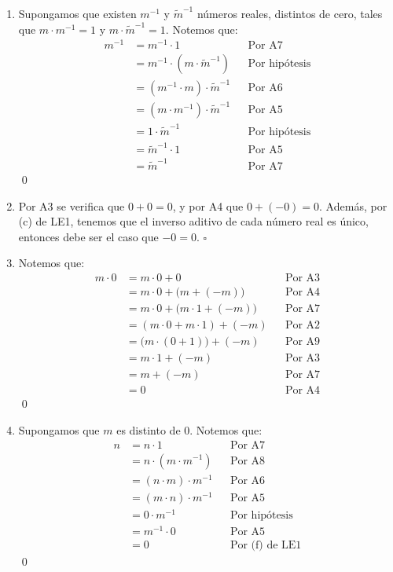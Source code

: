 \documentclass[11pt]{article}
\begin{document}
\begin{enumerate}[label=\alph*), font=\bfseries]
    \item Supongamos que existen $m^{-1}$ y $\tilde{m}^{-1}$ números reales, distintos de cero, tales que $m \cdot m^{-1} = 1$ y $m \cdot \tilde{m}^{-1} = 1$. Notemos que:
        \begin{align*}
        m^{-1} &= m^{-1} \cdot 1 && \text{Por A7} \\
        &= m^{-1} \cdot \left(m \cdot \tilde{m}^{-1} \right) && \text{Por hipótesis} \\
        &= \left( m^{-1} \cdot m \right) \cdot \tilde{m} ^{-1} && \text{Por A6} \\
        &= \left(m \cdot m^{-1} \right) \cdot \tilde{m}^{-1} && \text{Por A5} \\
        &= 1 \cdot \tilde{m}^{-1} && \text{Por hipótesis} \\
        &= \tilde{m}^{-1} \cdot 1 && \text{Por A5} \\
        &= \tilde{m}^{-1} && \text{Por A7}
        \end{align*} \qed
    
    \item Por A3 se verifica que $0 + 0 = 0$, y por A4 que $0 + (-0) = 0$. Además, por (c) de LE1, tenemos que el inverso aditivo de cada número real es único, entonces debe ser el caso que $-0 = 0$. \mbox{}\hfill  $\square$
    
    \item Notemos que:
    \begin{align*}
        m\cdot0&=m\cdot0+0 && \text{Por A3}\\
        &=m\cdot0+\bigl(m+\left(-m\right)\bigr) && \text{Por A4}\\
        &=m\cdot0+\bigl(m\cdot1+\left(-m\right)\bigr) && \text{Por A7}\\
        &=\left(m\cdot0+m\cdot1\right)+\left(-m\right) && \text{Por A2}\\
        &=\bigl(m\cdot\left(0+1\right)\bigr)+\left(-m\right) && \text{Por A9}\\
        &=m\cdot1+\left(-m\right) && \text{Por A3}\\
        &=m+\left(-m\right) && \text{Por A7}\\
        &=0 && \text{Por A4}
    \end{align*} \qed
    
    \item Supongamos que $m$ es distinto de $0$. Notemos que:
    \begin{align*}
        n &= n \cdot 1	&& \text{Por A7} \\
        &= n \cdot  \left(m \cdot m^{-1}  \right) 	&& \text{Por A8} \\
        &= \left(n \cdot m \right)  \cdot m^{-1}	&& \text{Por A6} \\
        &= \left(m \cdot n \right)  \cdot m^{-1}	&& \text{Por A5} \\
        &= 0 \cdot m^{-1}	&& \text{Por hipótesis}\\
        &= m^{-1} \cdot 0	&& \text{Por A5}\\
        &= 0 && \text{Por (f) de LE1}
    \end{align*} \qed
    

\end{enumerate}
\end{document}
